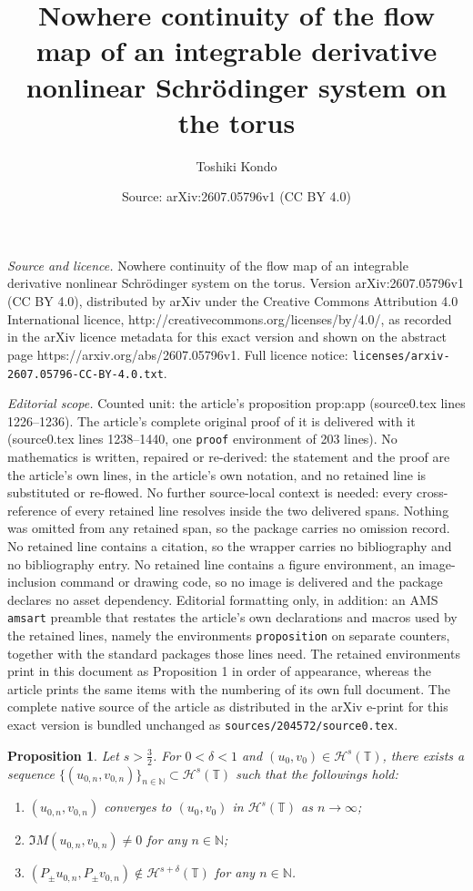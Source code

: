 \documentclass[10pt,a4paper]{amsart}
\title{Nowhere continuity of the flow map of an integrable derivative nonlinear Schr\"odinger system on the torus}
\author{Toshiki Kondo}
\date{Source: arXiv:2607.05796v1 (CC BY 4.0)}
\newtheorem{proposition}{Proposition}
\renewcommand{\H}{\mathcal H}
\newcommand{\N}{\mathbb{N}}
\newcommand{\T}{\mathbb{T}}
\newcommand{\dl}{\delta}
\begin{document}
\maketitle

\noindent\emph{Source and licence.} Nowhere continuity of the flow map of an integrable derivative nonlinear Schr\"odinger system on the torus. Version arXiv:2607.05796v1 (CC BY 4.0), distributed by arXiv under the Creative Commons Attribution 4.0 International licence, http://creativecommons.org/licenses/by/4.0/, as recorded in the arXiv licence metadata for this exact version and shown on the abstract page https://arxiv.org/abs/2607.05796v1. Full licence notice: \texttt{licenses/arxiv-2607.05796-CC-BY-4.0.txt}.\par\smallskip

\noindent\textit{Editorial scope.} Counted unit: the article's proposition prop:app (source0.tex lines 1226--1236). The article's complete original proof of it is delivered with it (source0.tex lines 1238--1440, one \texttt{proof} environment of 203 lines). No mathematics is written, repaired or re-derived: the statement and the proof are the article's own lines, in the article's own notation, and no retained line is substituted or re-flowed.  No further source-local context is needed: every cross-reference of every retained line resolves inside the two delivered spans.  Nothing was omitted from any retained span, so the package carries no omission record.  No retained line contains a citation, so the wrapper carries no bibliography and no bibliography entry.  No retained line contains a figure environment, an image-inclusion command or drawing code, so no image is delivered and the package declares no asset dependency.  Editorial formatting only, in addition: an AMS \texttt{amsart} preamble that restates the article's own declarations and macros used by the retained lines, namely the environments \texttt{proposition} on separate counters, together with the standard packages those lines need.  The retained environments print in this document as Proposition 1 in order of appearance, whereas the article prints the same items with the numbering of its own full document.  The complete native source of the article as distributed in the arXiv e-print for this exact version is bundled unchanged as \texttt{sources/204572/source0.tex}.
\begin{proposition}
\label{prop:app} 
Let $s > \frac 32$. For $0<\dl<1$ and $(u_0, v_0) \in \H^s(\T)$, there exists a sequence
$\{(u_{0,n}, v_{0,n})\}_{n \in \N} \subset \H^s(\T)$ such that the followings hold:
\begin{enumerate}
\item $(u_{0,n}, v_{0,n})$ converges to $(u_0, v_0)$ in $\H^s(\T)$ as $n \to \infty$;
\item $\Im M (u_{0, n}, v_{0, n}) \neq 0$ for any $n \in \N$;
\item $(P_\pm u_{0,n}, P_\pm v_{0,n}) \notin \H^{s+\dl}(\T)$ for any $n \in \N$.
\end{enumerate}
\end{proposition}
\end{document}
